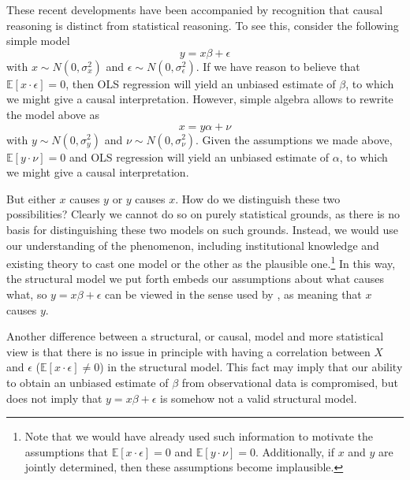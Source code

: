 \documentclass[11pt]{amsart}
\begin{document}
These recent developments have been accompanied by recognition that causal reasoning is distinct from statistical reasoning.
To see this, consider the following simple model
\[ y = x \beta + \epsilon \]
with $x \sim N(0, \sigma_x^2)$ and $\epsilon  \sim N(0, \sigma_{\epsilon}^2)$.
If we have reason to believe that $\mathbb{E}[x \cdot \epsilon] = 0$, then OLS regression will yield an unbiased estimate of $\beta$, to which we might give a causal interpretation.
However, simple algebra allows to rewrite the model above as 
\[ x = y \alpha + \nu \]
with $y \sim N(0, \sigma_y^2)$ and $\nu  \sim N(0, \sigma_{\nu}^2)$.
Given the assumptions we made above, $\mathbb{E}[y \cdot \nu] = 0$ and OLS regression will yield an unbiased estimate of $\alpha$, to which we might give a causal interpretation.

But either $x$ causes $y$ or $y$ causes $x$. 
How do we distinguish these two possibilities?
Clearly we cannot do so on purely statistical grounds, as there is no basis for distinguishing these two models on such grounds.
Instead, we would use our understanding of the phenomenon, including institutional knowledge and existing theory to cast one model or the other as the plausible one.\footnote{
Note that we would have already used such information to motivate the assumptions that $\mathbb{E}[x \cdot \epsilon] = 0$ and $\mathbb{E}[y \cdot \nu] = 0$.
Additionally, if $x$ and $y$ are jointly determined, then these assumptions become implausible.}
In this way, the structural model we put forth embeds our assumptions about what causes what, so $y = x \beta + \epsilon$ can be viewed in the sense used by \citep[p.979]{Goldberger:1972cq}, as meaning that $x$ causes $y$.

Another difference between a structural, or causal, model and more statistical view is that there is no issue in principle with having a correlation between $X$ and $\epsilon$ ($\mathbb{E} [x \cdot \epsilon] \neq 0$) in the structural model.
This fact may imply that our ability to obtain an unbiased estimate of $\beta$ from observational data is compromised, but does not imply that $y = x \beta + \epsilon$ is somehow not a valid structural model.
\end{document}
